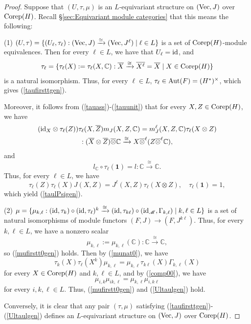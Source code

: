 \documentclass{amsart}
\theoremstyle{definition}
\newcommand{\id}{{\rm id}}
\newcommand{\Vect}{{\rm Vec}}
\newcommand{\M}{\mathscr{M}}
\newcommand{\ot}{\otimes}
\numberwithin{equation}{section}
\begin{document}
\begin{proof}
Suppose that $(U,\tau,\mu)$ is an $L$-equivariant structure on $(\Vect,J)$ over ${\rm Corep}(H)$. Recall \S\ref{sec:Equivariant module categories} that this means the following:

(1) $(U,\tau)=\{(U_{\ell},\tau_{\ell}):(\Vect,J)\xrightarrow{\simeq} (\Vect,J^{\ell})\mid \ell\in L\}$ 
is a set of ${\rm Corep}(H)$-module equivalences. Then for every $\ell\in L$, we have that $U_{\ell}=\id$, and   
$$\tau_{\ell}=\{\tau_{\ell}(X):=\tau_{\ell}(X,\mathbb{C}):\overline{X}\xrightarrow{\cong}\overline{X^{\ell}}=\overline{X}\mid X\in {\rm Corep}(H)\}$$
is a natural isomorphism. Thus, for every $\ell\in L$, $\tau_{\ell}\in {\rm Aut}(F)=(H^*)^{\times}$, which gives  (\ref{taufirsttgen}). 

Moreover, it follows from (\ref{tauass})-(\ref{tauunit}) that for every $X,Z\in {\rm Corep}(H)$, we have
\begin{gather*}
(\id_{X}\ot \tau_{\ell}(Z))\tau_{\ell}(X,\overline{Z})m_{J}(X,Z,\mathbb{C})
= m_{J}^{\ell}(X,Z,\mathbb{C})\tau_{\ell}(X\ot Z)\\
:(\overline{X}\ot \overline{Z})\overline{\ot} \mathbb{C}\xrightarrow{\cong} X\overline{\ot}^{\ell}(Z\overline{\ot}^{\ell} \mathbb{C}),
\end{gather*}
and
\begin{equation*}
l_{\mathbb{C}}\circ\tau_{\ell}(\mathbf{1})=l:\mathbb{C}\xrightarrow{\cong}\mathbb{C}.
\end{equation*}
Thus, for every $\ell\in L$, we have
$$\tau_{\ell}(Z)\tau_{\ell}(X)J(X,Z)= J^{\ell}(X,Z)\tau_{\ell}(X\ot Z),\quad \tau_{\ell}(\mathbf{1})=1,$$
which yield (\ref{taulPsigen}).

(2) $\mu=\{\mu_{k,\ell}: (\id,\tau_{k})\circ(\id,\tau_{\ell})^k\xrightarrow{\cong}(\id,\tau_{k\ell})\circ(\id_{\M},\Gamma_{k,\ell})\mid k,\ell\in L\}$ is a set of natural isomorphisms of module functors $(F,J)\to (F,J^{k\ell})$. Thus, 
for every $k,\ell\in L$, we have a nonzero scalar 
$$\mu_{k,\ell}:=\mu_{k,\ell}(\mathbb{C}): \mathbb{C}\xrightarrow{\cong}\mathbb{C},$$
so (\ref{mufirstt0gen}) holds. Then by (\ref{munat0}), we have 
$$
\tau_k(X)\tau_{\ell}(X^k)\mu_{k,\ell}=\mu_{k,\ell}\tau_{k\ell}(X)\Gamma_{k,\ell}(X)$$
for every $X\in {\rm Corep}(H)$ and $k,\ell\in L$,  
and by (\ref{comp00}), we have 
$$
\mu_{i,k}\mu_{ik,\ell}=\mu_{k,\ell}\mu_{i,k\ell}
$$
for every $i,k,\ell\in L$. 
Thus, (\ref{mufirstt0gen}) and (\ref{Ultaulgen}) hold.

Conversely, it is clear that any pair $(\tau,\mu)$ satisfying (\ref{taufirsttgen})-(\ref{Ultaulgen}) defines an $L$-equivariant structure on $(\Vect,J)$ over ${\rm Corep}(H)$.
\end{proof}
\end{document}
